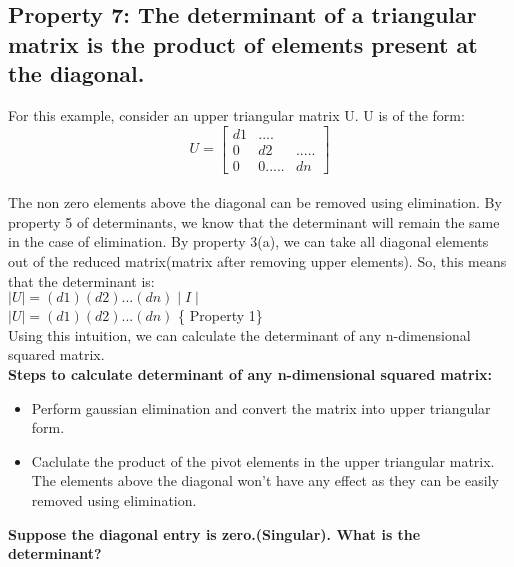 \documentclass[]{article}
\begin{document}
\subsection{Property 7: The determinant of a triangular matrix is the product of elements present at the diagonal.}
\vspace{10pt}

For this example, consider an upper triangular matrix U. U is of the form:\\

\noindent
\[
U=\begin{bmatrix}
	d1&....\\
	0&d2&.....\\
	0&0.....&dn
\end{bmatrix}
\]\\

\noindent
The non zero elements above the diagonal can be removed using elimination. By property 5 of determinants, we know that the determinant will remain the same in the case of elimination. By property 3(a), we can take all diagonal elements out of the reduced matrix(matrix after removing upper elements). So, this means that the determinant is:\\

\noindent
$\mid U \mid = (d1)(d2)...(dn)\mid I \mid$\\

\noindent
$\mid U \mid = (d1)(d2)...(dn)$ \{ Property 1\}\\

\noindent
Using this intuition, we can calculate the determinant of any n-dimensional squared matrix.\\

\noindent
\textbf{Steps to calculate determinant of any n-dimensional squared matrix:}\\
\begin{itemize}
	\item Perform gaussian elimination and convert the matrix into upper triangular form.
	\item Caclulate the product of the pivot elements in the upper triangular matrix. The elements above the diagonal won't have any effect as they can be easily removed using elimination.\\
\end{itemize}
	
\noindent
\textbf{Suppose the diagonal entry is zero.(Singular). What is the determinant?}\\
\end{document}
